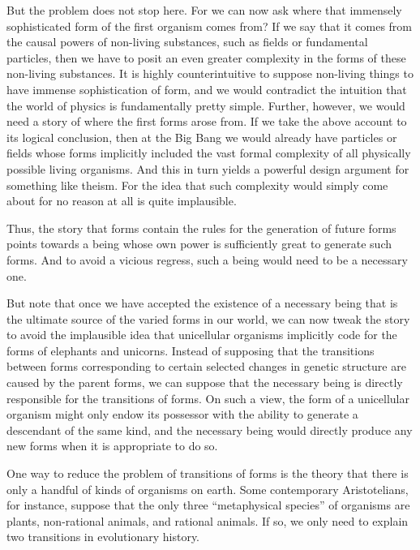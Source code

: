 But the problem does not stop here. For we can now ask where that immensely sophisticated form of the first organism comes
from? If we say that it comes from the causal powers of non-living substances, such as fields or fundamental particles,
then we have to posit an even greater complexity in the forms of these non-living substances. It is highly
counterintuitive to suppose non-living things to have immense sophistication of form, and we would contradict
the intuition that the world of physics is fundamentally pretty simple. Further, however, we would need a 
story of where the first forms arose from. If we take the above account to its logical conclusion, then at the Big Bang
we would already have particles or fields whose forms implicitly included the vast formal complexity of all physically
possible living organisms. And this in turn yields a powerful design argument for something like theism. For the idea that such complexity would
simply come about for no reason at all is quite implausible. 

Thus, the story that forms contain the rules for the generation of future forms points towards a being whose own power is
sufficiently great to generate such forms. And to avoid a vicious regress, such a being would need to be a necessary one.

But note that once we have accepted the existence of a necessary being that is the ultimate source of the varied forms 
in our world, we can now tweak the story to avoid the implausible idea that unicellular organisms implicitly code for
the forms of elephants and unicorns. Instead of supposing that the transitions between forms corresponding to certain
selected changes in genetic structure are caused by the parent forms, we can suppose that the necessary being is directly
responsible for the transitions of forms. On such a view, the form of a unicellular organism might only endow its
possessor with the ability to generate a descendant of the same kind, and the necessary being would directly produce
any new forms when it is appropriate to do so.

One way to reduce the problem of transitions of forms is the theory that there is only a handful of kinds of
organisms on earth. Some contemporary Aristotelians, for instance, suppose that the only three ``metaphysical
species'' of organisms are plants, non-rational animals, and rational animals. If so, we only need to explain
two transitions in evolutionary history. 

